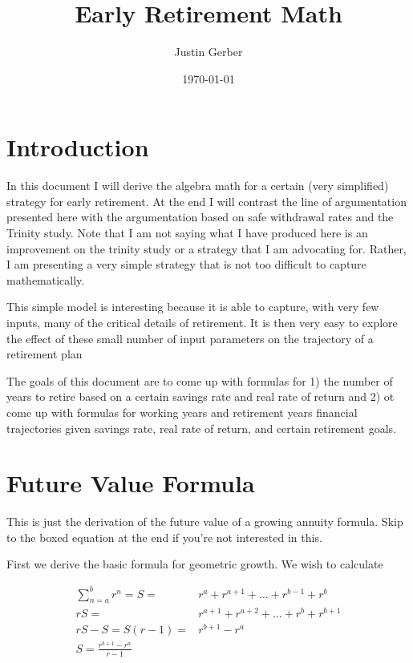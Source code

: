 \documentclass[12pt]{article}
\begin{document}
\title{Early Retirement Math}
\author{Justin Gerber}
\date{\today}
\maketitle

\section{Introduction}

In this document I will derive the algebra math for a certain (very simplified) strategy for early retirement.
At the end I will contrast the line of argumentation presented here with the argumentation based on safe withdrawal rates and the Trinity study.
Note that I am not saying what I have produced here is an improvement on the trinity study or a strategy that I am advocating for.
Rather, I am presenting a very simple strategy that is not too difficult to capture mathematically.

This simple model is interesting because it is able to capture, with very few inputs, many of the critical details of retirement.
It is then very easy to explore the effect of these small number of input parameters on the trajectory of a retirement plan

The goals of this document are to come up with formulas for 1) the number of years to retire based on a certain savings rate and real rate of return and 2) ot come up with formulas for working years and retirement years financial trajectories given savings rate, real rate of return, and certain retirement goals.

\section{Future Value Formula}

This is just the derivation of the future value of a growing annuity formula. 
Skip to the boxed equation at the end if you're not interested in this.

First we derive the basic formula for geometric growth. We wish to calculate

\begin{align}
\sum_{n=a}^b r^n = S =& r^a + r^{a+1} + \ldots + r^{b-1} + r^b\\
rS =& r^{a+1} + r^{a+2} + \ldots + r^b + r^{b+1}\\
rS - S = S(r-1) =& r^{b+1} - r^{a}\\
S = \frac{r^{b+1} - r^a}{r-1}
\end{align}
\end{document}
